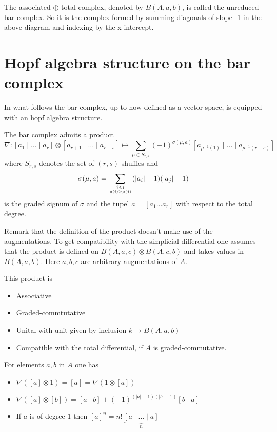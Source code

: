 The associated $\oplus$-total complex, denoted by $B(A, a, b)$, is called the unreduced bar complex. 
So it is the complex formed by summing diagonals of slope -1 in the above diagram and indexing by the x-intercept.


\section{Hopf algebra structure on the bar complex} 
In what follows the bar complex, up to now defined as a vector space, is equipped with an hopf algebra structure. 

\begin{defn}
The bar complex admits a product
\[
\nabla : [a_1 \mid \ldots \mid a_r] \otimes [a_{r+1} \mid \ldots \mid a_{r+s}] \mapsto \sum_{\mu \in S_{r,s}} (-1)^{\sigma(\mu, a)} [a_{\mu^{-1}(1)} \mid \ldots \mid a_{\mu^{-1}(r+s)}]
\]
where $S_{r,s}$ denotes the set of $(r,s)$-shuffles and 
\begin{align} \label{graded_sign}
   \sigma(\mu,a) = \sum \limits_{\genfrac{}{}{0pt}{2}{i < j}{ \mu(i) > \mu(j) }} (|a_{i}|-1) (|a_{j}|-1)
\end{align}
is the graded signum of $\sigma$ and the tupel $a=[a_1 \ldots a_r]$ with respect to the total degree. 
\end{defn}

Remark that the definition of the product doesn't make use of the augmentations. 
To get compatibility with the simplicial differential one assumes that the product is defined on $B(A,a,c) \otimes B(A,c,b)$ and takes values in $B(A,a,b)$. Here $a,b,c$ are arbitrary augmentations of $A$.


This product is 
\begin{itemize}
\item Associative
\item Graded-commtutative
\item Unital with unit given by inclusion $k \to B(A, a, b)$
\item Compatible with the total differential, if $A$ is graded-commutative.
\end{itemize}

\begin{exam} For elements $a,b$ in $A$ one has
\begin{itemize}
\item $\nabla([a] \otimes 1) = [a] = \nabla( 1 \otimes [a] )$
\item $\nabla([a] \otimes [b]) = [a \mid b] + (-1)^{(|a|-1)(|b|-1)}[b \mid a]$
\item If $a$ is of degree $1$ then $[a]^n = n! \, \underset{n}{\underbrace{[a \mid \ldots\mid a]}}$
\end{itemize}
\end{exam} 

